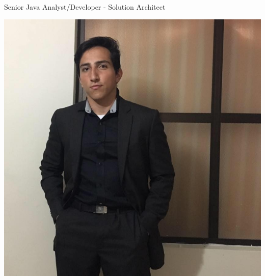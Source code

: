 \documentclass[american]{cv-class}
\begin{document}
{Senior Java Analyst/Developer - Solution Architect }

\vspace{1.15cm}

\begin{aside}
	\includegraphics[scale=0.15]{img/indice.png}
	~
	\vspace{0.35cm}

\end{aside}
\end{document}
